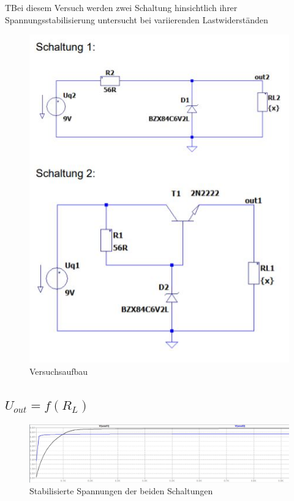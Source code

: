 \documentclass{article}
\begin{document}
\begin{task}
  TBei diesem Versuch werden zwei Schaltung hinsichtlich ihrer Spannungsstabilisierung untersucht bei variierenden Lastwiderständen
\end{task}

\begin{figure}[h]
  \centering
  \includegraphics[scale=0.8]{../assets/images/EL1P3/schaltung 3.JPG}
  \caption{Versuchsaufbau}
\end{figure}

\subsection{$U_{out} = f (R_L)$}
\begin{figure}[h]
  \centering
  \includegraphics[scale=0.4]{../assets/images/EL1P3/aufgabe 3 u messung.JPG}
  \caption{Stabilisierte Spannungen der beiden Schaltungen}
\end{figure}
\end{document}
